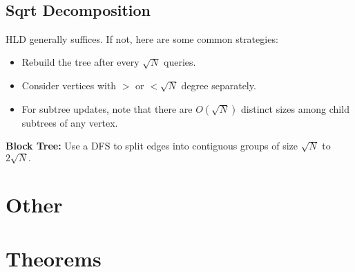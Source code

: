     \

    \subsection{Sqrt Decomposition}
		HLD generally suffices. If not, here are some common strategies:
		\begin{itemize}
			\item Rebuild the tree after every $\sqrt N$ queries. 
			\item Consider vertices with $>$ or $<\sqrt N$ degree separately. 
			\item For subtree updates, note that there are $O(\sqrt N)$ distinct sizes among child subtrees of any vertex.
		\end{itemize}

		\textbf{Block Tree:} Use a DFS to split edges into contiguous groups of size $\sqrt N$ to $2\sqrt N.$





\section{Other}

\section{Theorems}

